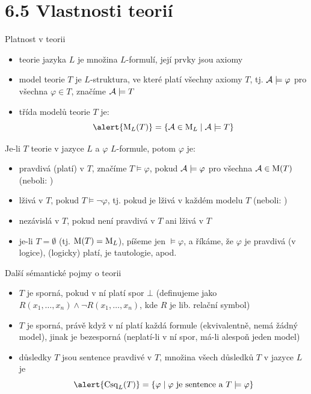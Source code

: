 \documentclass{beamer}
\begin{document}
\section{6.5 Vlastnosti teorií}


\begin{frame}{Platnost v teorii}

    \begin{itemize}
        \item \alert{teorie} jazyka $L$ je množina $L$-formulí, její prvky jsou \alert{axiomy}\pause
        \item \alert{model} teorie $T$ je $L$-struktura, ve které platí všechny axiomy $T$, tj. $\mathcal{A}\models\varphi$ pro všechna $\varphi\in T$, značíme $\mathcal{A}\models T$\pause
        \item \alert{třída modelů} teorie $T$ je:
        $$
        \alert{\M_L(T)}=\{\A\in\M_L\mid\A\models T\}
        $$
    \end{itemize}
    
    \pause
    Je-li $T$ teorie v jazyce $L$ a $\varphi$ $L$-formule, potom $\varphi$ je:\pause
    \begin{itemize}
        \item \alert{pravdivá (platí) v $T$}, značíme \alert{$T\models\varphi$}, pokud $\mathcal{A}\models\varphi$ pro všechna $\mathcal{A}\in\operatorname{M}(T)$ (neboli: )\pause
        \item \alert{lživá v $T$}, pokud $T\models\neg\varphi$, tj. pokud je lživá v každém modelu $T$ (neboli: )\pause
        \item \alert{nezávislá v $T$}, pokud není pravdivá v $T$ ani lživá v $T$\pause
        \item je-li $T=\emptyset$ (tj. $\operatorname{M}(T)=\operatorname{M}_L$), píšeme jen \alert{$\models\varphi$}, a říkáme, že $\varphi$ \alert{je pravdivá (v logice), (logicky) platí, je tautologie}, apod.
    \end{itemize}
    
\end{frame}


\begin{frame}{Další sémantické pojmy o teorii}
    
    \begin{itemize}
        \item $T$ je \alert{sporná}, pokud v ní platí \alert{spor} $\bot$ (definujeme jako $R(x_1,\dots,x_n)\land \neg R(x_1,\dots,x_n)$, kde $R$ je lib. relační symbol)\pause
        \item $T$ je sporná, právě když v ní platí každá formule (ekvivalentně, nemá žádný model), jinak je \alert{bezesporná} (neplatí-li v ní spor, má-li alespoň jeden model)\pause
        \item \alert{důsledky} $T$ jsou \alert{sentence} pravdivé v $T$, množina všech důsledků $T$ v jazyce $L$ je
        $$
        \alert{\Conseq_L(T)}=\{\varphi\mid\text{$\varphi$ je sentence a }T\models \varphi\}
        $$
    \end{itemize}

\end{frame}
\end{document}
